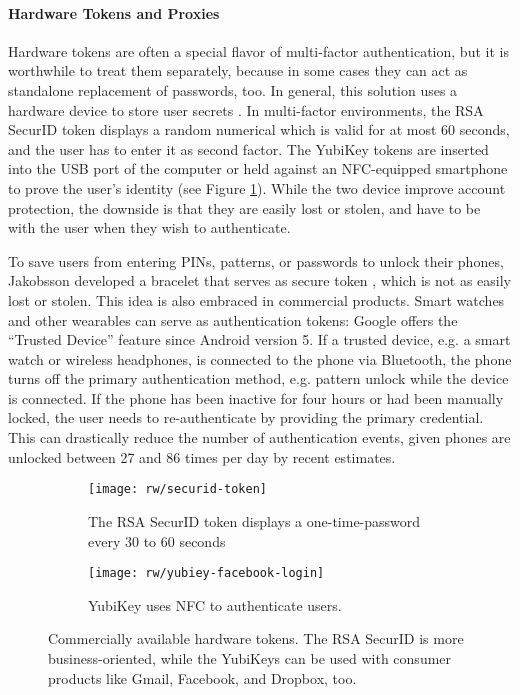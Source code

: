 	\paragraph{Hardware Tokens and Proxies}
	Hardware tokens are often a special flavor of multi-factor authentication, but it is worthwhile to treat them separately, because in some cases they can act as standalone replacement of passwords, too. In general, this solution uses a hardware device to store user secrets \cite{Bonneau2012ReplacePasswords}. In multi-factor environments, the RSA SecurID token displays a random numerical which is valid for at most 60 seconds, and the user has to enter it as second factor. The YubiKey tokens are inserted into the USB port of the computer or held against an NFC-equipped smartphone to prove the user's identity (see Figure \ref{fig:rw:hardware_tokens}). While the two device improve account protection, the downside is that they are easily lost or stolen, and have to be with the user when they wish to authenticate. 
	
	To save users from entering PINs, patterns, or passwords to unlock their phones, Jakobsson developed a bracelet that serves as secure token \cite{Jakobsson2014HowToWearYourPW}, which is not as easily lost or stolen. This idea is also embraced in commercial products. Smart watches and other wearables can serve as authentication tokens: Google offers the ``Trusted Device'' feature since Android version 5. If a trusted device, e.g. a smart watch or wireless headphones, is connected to the phone via Bluetooth, the phone turns off the primary authentication method, e.g. pattern unlock while the device is connected. If the phone has been inactive for four hours or had been manually locked, the user needs to re-authenticate by providing the primary credential. This can drastically reduce the number of authentication events, given phones are unlocked between 27 and 86 times per day by recent estimates\cite{Deloitte2017ConsumerSurveyUS, Stachl2017PersonalitySmartphones}. 
	
	\begin{figure}[htbp]
		\centering
		\begin{subfigure}[t]{0.49\linewidth}
			\texttt{[image: rw/securid-token]}
			\caption{The RSA SecurID token displays a one-time-password every 30 to 60 seconds}
		\end{subfigure}
		\begin{subfigure}[t]{0.49\linewidth}
			\texttt{[image: rw/yubiey-facebook-login]}
			\caption{YubiKey uses NFC to authenticate users.}
		\end{subfigure}
		\caption{\label{fig:rw:hardware_tokens} Commercially available hardware tokens. The RSA SecurID is more business-oriented, while the YubiKeys can be used with consumer products like Gmail, Facebook, and Dropbox, too.}
	\end{figure}
	
